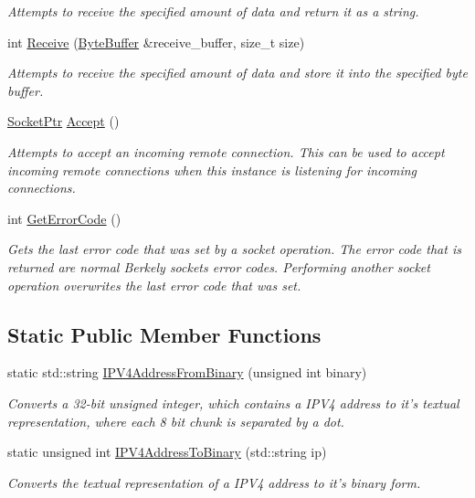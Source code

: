 \begin{DoxyCompactItemize}
\begin{DoxyCompactList}\small\item\em Attempts to receive the specified amount of data and return it as a string. \end{DoxyCompactList}\item 
int \hyperlink{class_senergy_1_1_socket_aad6b0a1a9f7ac380b11b9ef814ada58b}{Receive} (\hyperlink{class_senergy_1_1_byte_buffer}{Byte\-Buffer} \&receive\-\_\-buffer, size\-\_\-t size)
\begin{DoxyCompactList}\small\item\em Attempts to receive the specified amount of data and store it into the specified byte buffer. \end{DoxyCompactList}\item 
\hyperlink{class_senergy_1_1_socket_ac9ff20ce80df2d0c2900cd0940ffe860}{Socket\-Ptr} \hyperlink{class_senergy_1_1_socket_abefda24a1a73b49e108a54342be0457e}{Accept} ()
\begin{DoxyCompactList}\small\item\em Attempts to accept an incoming remote connection. This can be used to accept incoming remote connections when this instance is listening for incoming connections. \end{DoxyCompactList}\item 
int \hyperlink{class_senergy_1_1_socket_a403f7a2f6c5a94d4b14f73f0965da061}{Get\-Error\-Code} ()
\begin{DoxyCompactList}\small\item\em Gets the last error code that was set by a socket operation. The error code that is returned are normal Berkely sockets error codes. Performing another socket operation overwrites the last error code that was set. \end{DoxyCompactList}\end{DoxyCompactItemize}
\subsection*{Static Public Member Functions}
\begin{DoxyCompactItemize}
\item 
static std\-::string \hyperlink{class_senergy_1_1_socket_a824cf26338b12e1591b78d23abf6032a}{I\-P\-V4\-Address\-From\-Binary} (unsigned int binary)
\begin{DoxyCompactList}\small\item\em Converts a 32-\/bit unsigned integer, which contains a I\-P\-V4 address to it's textual representation, where each 8 bit chunk is separated by a dot. \end{DoxyCompactList}\item 
static unsigned int \hyperlink{class_senergy_1_1_socket_a74c62f0fb79be1192eed5f2fd092dd50}{I\-P\-V4\-Address\-To\-Binary} (std\-::string ip)
\begin{DoxyCompactList}\small\item\em Converts the textual representation of a I\-P\-V4 address to it's binary form. \end{DoxyCompactList}\end{DoxyCompactItemize}


